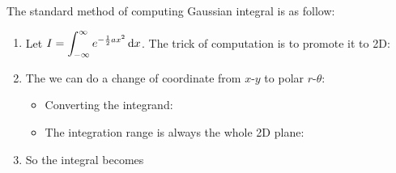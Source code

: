 \documentclass[class=article, crop=false, 12pt]{standalone}
\begin{document}
\begin{notation}
    The standard method of computing Gaussian integral is as follow:
    \begin{enumerate}
        \item Let $\displaystyle I = \int_{-\infty}^{\infty} e^{-\frac{1}{2} ax^2} \dd{x}$. 
        The trick of computation is to promote it to 2D:

        \item The we can do a change of coordinate from $x$-$y$ to polar $r$-$\theta$: 
        \begin{itemize}
            \item Converting the integrand:
            

            \item The integration range is always the whole 2D plane:
        \end{itemize}

        \item So the integral becomes 
            
    \end{enumerate}
\end{notation}
\end{document}
